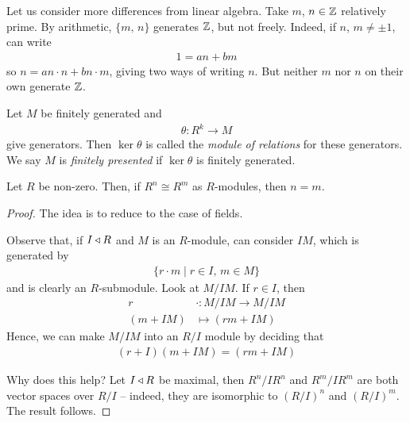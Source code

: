 \documentclass{../../template/note}
\begin{document}
    \begin{remark*}
        Let us consider more differences from linear algebra. Take $m$, $n \in \mathbb Z$ relatively prime. By arithmetic, $\{m,\,n\}$ generates $\mathbb Z$, but not freely. Indeed, if $n$, $m \neq \pm 1$, can write
        \begin{align*}
            1 = an+bm
        \end{align*}
        so $n = an \cdot n + bn \cdot m$, giving two ways of writing $n$. But neither $m$ nor $n$ on their own generate $\mathbb Z$.        
    \end{remark*}
    
    \begin{definition}
        Let $M$ be finitely generated and
        \begin{align*}
            \theta: R^k \to M
        \end{align*}
        give generators. Then $\ker \theta$ is called the \emph{module of relations} for these generators. We say $M$ is \emph{finitely presented} if $\ker \theta$ is finitely generated.        
    \end{definition}
    
    \begin{proposition}
        Let $R$ be non-zero. Then, if $R^n \cong R^m$ as $R$-modules, then $n = m$.
    \end{proposition}
    
    \begin{proof}
        The idea is to reduce to the case of fields.

        Observe that, if $I \triangleleft R$ and $M$ is an $R$-module, can consider $IM$, which is generated by
        \begin{align*}
            \{r \cdot m \mid r \in I,\, m \in M\}
        \end{align*}
        and is clearly an $R$-submodule. Look at $M/IM$. If $r \in I$, then
        \begin{align*}
            r &\cdot : M/IM \to M/IM \\
            (m + IM) &\mapsto (rm + IM)
        \end{align*}
        Hence, we can make $M/IM$ into an $R/I$ module by deciding that
        \begin{align*}
            (r+I)(m+IM) = (rm+IM)
        \end{align*}
        
        Why does this help? Let $I \triangleleft R$ be maximal, then $R^n/IR^n$ and $R^m/IR^m$ are both vector spaces over $R/I$ -- indeed, they are isomorphic to $(R/I)^n$ and $(R/I)^m$. The result follows.
    \end{proof}
    
\end{document}
